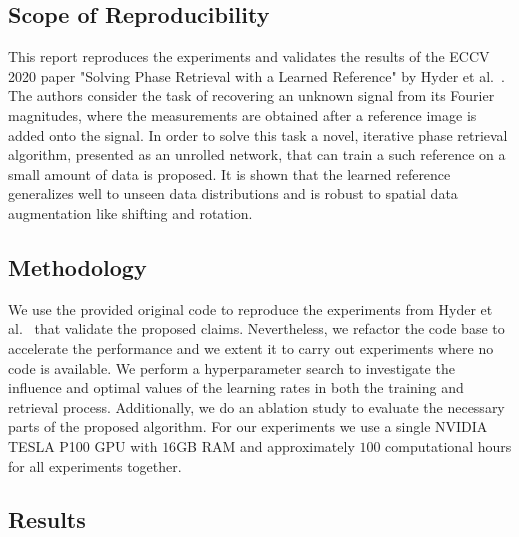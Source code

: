 \subsection*{Scope of Reproducibility}


This report reproduces the experiments and validates the results of the ECCV 2020 paper "Solving Phase Retrieval with a Learned Reference" by Hyder et al.~\cite{hyder2020solving}. The authors consider the task of recovering an unknown signal from its Fourier magnitudes, where the measurements are obtained after a reference image is added onto the signal. In order to solve this task a novel, iterative phase retrieval algorithm, presented as an unrolled network, that can train a such reference on a small amount of data is proposed. It is shown that the learned reference generalizes well to unseen data distributions and is robust to spatial data augmentation like shifting and rotation.

\subsection*{Methodology}




We use the provided original code to reproduce the experiments from Hyder et al.~\cite{hyder2020solving} that validate the proposed claims. Nevertheless, we refactor the code base to accelerate the performance and we extent it to carry out experiments where no code is available. We perform a hyperparameter search to investigate the influence and optimal values of the learning rates in both the training and retrieval process. Additionally, we do an ablation study to evaluate the necessary parts of the proposed algorithm. For our experiments we use a single NVIDIA TESLA P100 GPU with $16$GB RAM and approximately $100$ computational hours for all experiments together.

\subsection*{Results}

